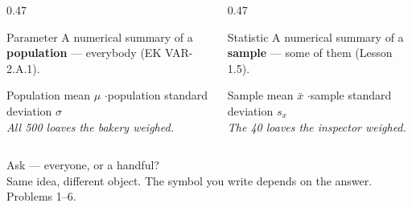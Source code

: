 \documentclass[aspectratio=169, 11pt]{beamer}
\begin{document}
\begin{frame}[t, plain]
  \vspace{4pt}
  \begin{columns}[t]
    \begin{column}{0.47\textwidth}
      \begin{block}{Parameter}
        A numerical summary of a \textbf{population} --- everybody (EK VAR-2.A.1).
      \end{block}
      \vspace{4pt}
      {\small Population mean $\mu$ \quad$\cdot$\quad population standard deviation $\sigma$
      \\[3pt]
      \emph{All 500 loaves the bakery weighed.}}
    \end{column}
    \begin{column}{0.47\textwidth}
      \begin{block}{Statistic}
        A numerical summary of a \textbf{sample} --- some of them (Lesson 1.5).
      \end{block}
      \vspace{4pt}
      {\small Sample mean $\bar x$ \quad$\cdot$\quad sample standard deviation $s_x$\\[3pt]
      \emph{The 40 loaves the inspector weighed.}}
    \end{column}
  \end{columns}
  \vspace{12pt}
  \begin{center}
    {\large Ask  --- everyone, or a handful?}\\[6pt]
    {\small\color{slate} Same idea, different object. The symbol you write depends on the answer.
    Problems 1--6.}
  \end{center}
\end{frame}
\end{document}
